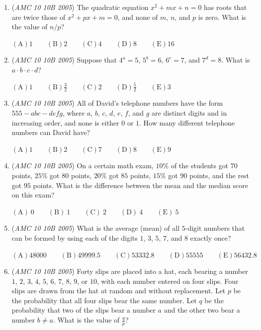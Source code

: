 \begin{enumerate}
 $\mathrm{(A)} \frac{1}{4} \qquad \mathrm{(B)} \frac{2}{5} \qquad \mathrm{(C)} \frac{3}{7} \qquad \mathrm{(D)} \frac{1}{2} \qquad \mathrm{(E)} \frac{2}{3}$


	\item (\textit{AMC 10 10B 2005}) The quadratic equation $x^2 + mx + n = 0$ has roots that are twice those of $x^2 + px + m = 0$, and none of $m$, $n$, and $p$ is zero. What is the value of $n/p$?


 $\mathrm{(A)} 1 \qquad \mathrm{(B)} 2 \qquad \mathrm{(C)} 4 \qquad \mathrm{(D)} 8 \qquad \mathrm{(E)} 16$


	\item (\textit{AMC 10 10B 2005}) Suppose that $4^a = 5$, $5^b = 6$, $6^c = 7$, and $7^d = 8$. What is $a \cdot b \cdot c \cdot d$?


 $\mathrm{(A)} 1 \qquad \mathrm{(B)} \frac{3}{2} \qquad \mathrm{(C)} 2 \qquad \mathrm{(D)} \frac{5}{2} \qquad \mathrm{(E)} 3$


	\item (\textit{AMC 10 10B 2005}) All of David's telephone numbers have the form $555-abc-defg$, where $a$, $b$, $c$, $d$, $e$, $f$, and $g$ are distinct digits and in increasing order, and none is either $0$ or $1$. How many different telephone numbers can David have?


 $\mathrm{(A)} 1 \qquad \mathrm{(B)} 2 \qquad \mathrm{(C)} 7 \qquad \mathrm{(D)} 8 \qquad \mathrm{(E)} 9$


	\item (\textit{AMC 10 10B 2005}) On a certain math exam, $10\%$ of the students got $70$ points, $25\%$ got $80$ points, $20\%$ got $85$ points, $15\%$ got $90$ points, and the rest got $95$ points. What is the difference between the mean and the median score on this exam?


 $\mathrm{(A)}\ 0 \qquad \mathrm{(B)}\ 1 \qquad \mathrm{(C)}\ 2 \qquad \mathrm{(D)}\ 4 \qquad \mathrm{(E)}\ 5$


	\item (\textit{AMC 10 10B 2005}) What is the average (mean) of all $5$-digit numbers that can be formed by using each of the digits $1$, $3$, $5$, $7$, and $8$ exactly once?


 $\mathrm{(A)} 48000 \qquad \mathrm{(B)} 49999.5 \qquad \mathrm{(C)} 53332.8 \qquad \mathrm{(D)} 55555 \qquad \mathrm{(E)} 56432.8$


	\item (\textit{AMC 10 10B 2005}) Forty slips are placed into a hat, each bearing a number $1$, $2$, $3$, $4$, $5$, $6$, $7$, $8$, $9$, or $10$, with each number entered on four slips. Four slips are drawn from the hat at random and without replacement. Let $p$ be the probability that all four slips bear the same number. Let $q$ be the probability that two of the slips bear a number $a$ and the other two bear a number $b \neq a$. What is the value of $\frac{q}{p}$?



\end{enumerate}
